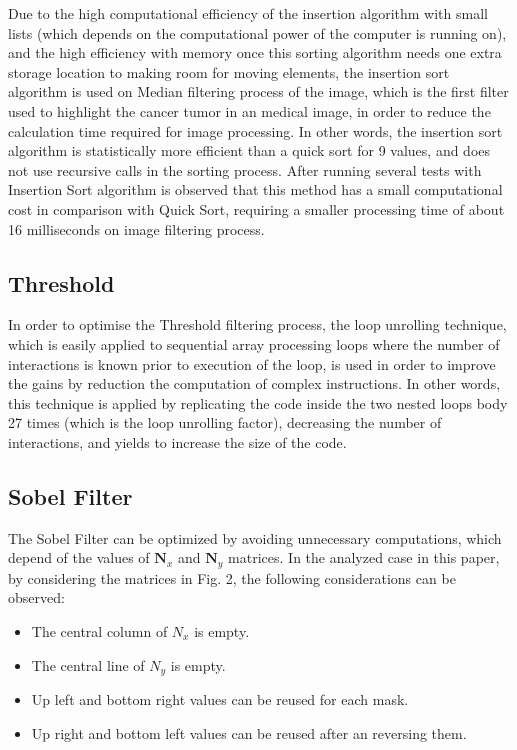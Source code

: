 \documentclass[journal]{IEEEtran}
\begin{document}
Due to the high computational efficiency of the insertion algorithm with small lists (which depends on the computational power of the computer is running on), and the high efficiency with memory once this sorting algorithm needs one extra storage location to making room for moving elements, the insertion sort algorithm is used on Median filtering process of the image, which is the first filter used to highlight the cancer tumor in an medical image, in order to reduce the calculation time required for image processing. In other words, the insertion sort algorithm is statistically more efficient than a quick sort for 9 values, and does not use recursive calls in the sorting process.
After running several tests with Insertion Sort algorithm is observed that this method has a small computational cost in comparison with Quick Sort, requiring a smaller processing time of about 16 milliseconds on image filtering process.

\subsection{Threshold}
In order to optimise the Threshold filtering process, the loop unrolling technique, which is easily applied to sequential array processing loops where the number of interactions is known prior to execution of the loop, is used in order to improve the gains by reduction the computation of complex instructions. In other words, this technique is applied by replicating the code inside the two nested loops body 27 times (which is the loop unrolling factor), decreasing the number of interactions, and yields to increase the size of the code.

\subsection{Sobel Filter}
The Sobel Filter can be optimized by avoiding unnecessary computations, which depend of the values of \textit{$\mathbf{N}_{x}$} and \textit{$\mathbf{N}_{y}$} matrices. In the analyzed case in this paper, by considering the matrices in Fig. 2, the following considerations can be observed:


\begin{itemize}
\item The central column of \(N_x\) is empty.
\item The central line of \(N_y\) is empty.
\item Up left and bottom right values can be reused for each mask.
\item Up right and bottom left values can be reused after an reversing them.
\end{itemize}
\end{document}
